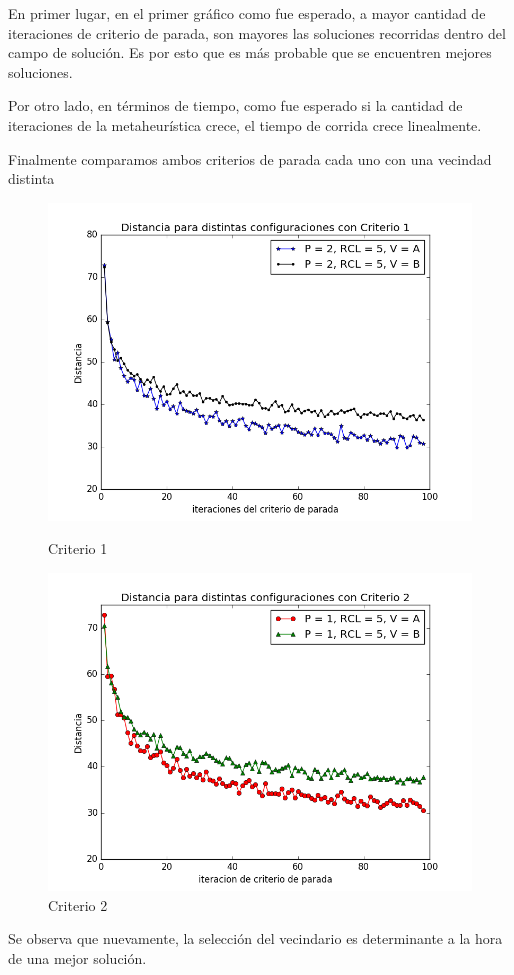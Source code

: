 En primer lugar, en el primer gráfico como fue esperado, a mayor cantidad de iteraciones de criterio de parada, son mayores las soluciones recorridas dentro del campo de solución. Es por esto que es más probable que se encuentren mejores soluciones.

\par Por otro lado, en términos de tiempo, como fue esperado si la cantidad de iteraciones de la metaheurística crece, el tiempo de corrida crece linealmente.

\par Finalmente comparamos ambos criterios de parada cada uno con una vecindad distinta


\begin{figure}[H]
  \includegraphics[width=\linewidth]{imagenes/Exp2Ej2DistanciaCrit1.png}
  \caption{Criterio 1}
\endminipage\hfill
{}%
  \includegraphics[width=\linewidth]{imagenes/Exp2Ej2DistanciaCrit2.png}
  \caption{Criterio 2}
\endminipage
\end{figure}



Se observa que nuevamente, la selección del vecindario es determinante a la hora de una mejor solución.
